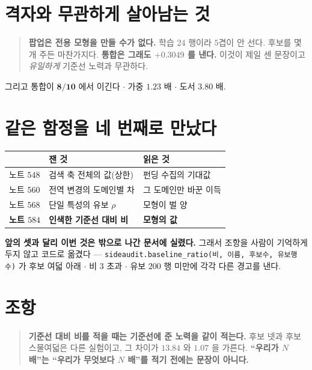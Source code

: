 \documentclass[11pt]{article}
\begin{document}
\section{격자와 무관하게 살아남는 것}

\begin{quote}
\textbf{팝업은 전용 모형을 만들 수가 없다.} 학습 $24$ 행이라 $5$겹이 안
선다. 후보를 몇 개 주든 마찬가지다. \textbf{통합은 그래도 $+0.3049$ 를
낸다.} 이것이 제일 센 문장이고 \emph{유일하게} 기준선 노력과 무관하다.
\end{quote}

그리고 통합이 $\mathbf{8/10}$ 에서 이긴다 $\cdot$ 가중 $\mathbf{1.23}$ 배
$\cdot$ 도서 $\mathbf{3.80}$ 배.

\section*{같은 함정을 네 번째로 만났다}

\begin{center}
\begin{tabular}{lll}
\hline
 & 잰 것 & 읽은 것 \\
\hline
노트 $548$ & 검색 축 전체의 값(상한) & 펀딩 수집의 기대값 \\
노트 $560$ & 전역 변경의 도메인별 차 & 그 도메인만 바꾼 이득 \\
노트 $568$ & 단일 특성의 유보 $\rho$ & 모형이 벌 양 \\
\textbf{노트 $584$} & \textbf{인색한 기준선 대비 비} & \textbf{모형의 값} \\
\hline
\end{tabular}
\end{center}

\textbf{앞의 셋과 달리 이번 것은 밖으로 나간 문서에 실렸다.} 그래서
조항을 사람이 기억하게 두지 않고 코드로 옮겼다 ---
\texttt{sideaudit.baseline\_ratio(비, 이름, 후보수, 유보행수)} 가 후보
여덟 아래 $\cdot$ 비 $3$ 초과 $\cdot$ 유보 $200$ 행 미만에 각각 다른
경고를 낸다.

\section*{조항}

\begin{quote}
\textbf{기준선 대비 비를 적을 때는 기준선에 준 노력을 같이 적는다.}
후보 넷과 후보 스물여덟은 다른 실험이고, 그 차이가 $13.84$ 와 $1.07$ 을
가른다. \textbf{``우리가 $N$ 배''는 ``우리가 무엇보다 $N$ 배''를 적기
전에는 문장이 아니다.}
\end{quote}
\end{document}
